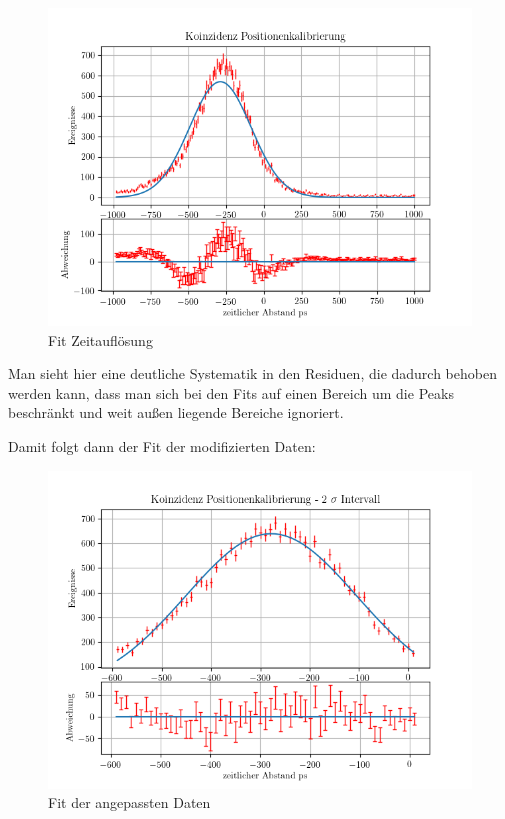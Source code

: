 \documentclass[12pt,twoside,a4paper]{scrartcl}
\begin{document}
					\begin{figure}[H]
						\centering

							\includegraphics[width=\textwidth]{Plots/Time/Positionenkalibrierung.png}

						\caption{Fit Zeitauflösung}
					\end{figure}

					Man sieht hier eine deutliche Systematik in den Residuen, die dadurch behoben werden kann, dass man sich bei den Fits auf einen Bereich um die Peaks beschränkt und weit außen liegende Bereiche ignoriert.

					Damit folgt dann der Fit der modifizierten Daten:

					\begin{figure}[H]
						\centering
							\includegraphics{Plots/Time/SelPositionenkalibrierung.png}
						\caption{Fit der angepassten Daten}
					\end{figure}
\end{document}
